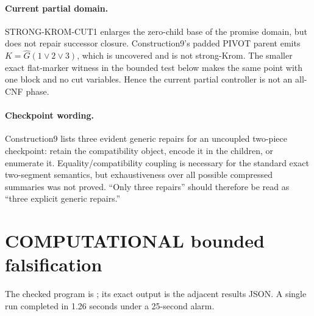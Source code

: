 \documentclass[11pt]{article}
\begin{document}
\paragraph{Current partial domain.}
STRONG-KROM-CUT1 enlarges the zero-child base of the promise domain, but does
not repair successor closure.  Construction9's padded PIVOT parent emits
$K=\widehat G(1\vee2\vee3)$, which is uncovered and is not strong-Krom.
The smaller exact flat-marker witness in the bounded test below makes the
same point with one block and no cut variables.  Hence the current partial
controller is not an all-CNF phase.

\paragraph{Checkpoint wording.}
Construction9 lists three evident generic repairs for an uncoupled two-piece
checkpoint: retain the compatibility object, encode it in the children, or
enumerate it.  Equality/compatibility coupling is necessary for the standard
exact two-segment semantics, but exhaustiveness over all possible compressed
summaries was not proved.  ``Only three repairs'' should therefore be read as
``three explicit generic repairs.''

\section{COMPUTATIONAL bounded falsification}

The checked program is
;
its exact output is the adjacent results JSON.  A single run completed in
1.26 seconds under a 25-second alarm.
\end{document}
